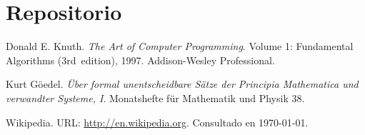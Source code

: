 \documentclass[a4paper,10pt,twocolumn]{article}
\begin{document}
\section{Repositorio}\label{sec:conc}


\begin{thebibliography}{99}
	 Donald E. Knuth. \emph{The Art of Computer Programming}.
		Volume 1: Fundamental Algorithms (3rd~edition), 1997.
		Addison-Wesley Professional.

	 Kurt Göedel. \emph{Über formal unentscheidbare Sätze der
		Principia Mathematica und verwandter Systeme, I}.
		Monatshefte für Mathematik und Physik 38.

	 Wikipedia. URL: \href{http://en.wikipedia.org}
	  {http://en.wikipedia.org}.
		Consultado en \today.

\end{thebibliography}


\label{end}
\end{document}
